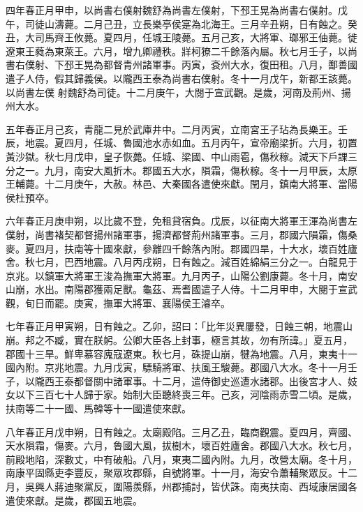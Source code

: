 \begin{pinyinscope}
 四年春正月甲申，以尚書右僕射魏舒為尚書左僕射，下邳王晃為尚書右僕射。戊午，司徒山濤薨。二月己丑，立長樂亭侯寔為北海王。三月辛丑朔，日有蝕之。癸丑，大司馬齊王攸薨。夏四月，任城王陵薨。五月己亥，大將軍、瑯邪王伷薨。徙遼東王蕤為東萊王。六月，增九卿禮秩。牂柯獠二千餘落內屬。秋七月壬子，以尚書右僕射、下邳王晃為都督青州諸軍事。丙寅，袞州大水，復田租。八月，鄯善國遣子人侍，假其歸義侯。以隴西王泰為尚書右僕射。冬十一月戊午，新都王該薨。以尚書左僕
 射魏舒為司徒。十二月庚午，大閱于宣武觀。是歲，河南及荊州、揚州大水。



 五年春正月己亥，青龍二見於武庫井中。二月丙寅，立南宮王子玷為長樂王。壬辰，地震。夏四月，任城、魯國池水赤如血。五月丙午，宣帝廟梁折。六月，初置黃沙獄。秋七月戊申，皇子恢薨。任城、梁國、中山雨雹，傷秋稼。減天下戶課三分之一。九月，南安大風折木。郡國五大水，隕霜，傷秋稼。冬十一月甲辰，太原王輔薨。十二月庚午，大赦。林邑、大秦國各遣使來獻。閏月，鎮南大將軍、當陽侯杜預卒。



 六年春正月庚申朔，以比歲不登，免租貸宿負。戊辰，以征南大將軍王渾為尚書左僕射，尚書褚契都督揚州諸軍事，揚濟都督荊州諸軍事。三月，郡國六隕霜，傷桑麥。夏四月，扶南等十國來獻，參離四千餘落內附。郡國四旱，十大水，壞百姓廬舍。秋七月，巴西地震。八月丙戌朔，日有蝕之。減百姓綿絹三分之一。白龍見于京兆。以鎮軍大將軍王浚為撫軍大將軍。九月丙子，山陽公劉康薨。冬十月，南安山崩，水出。南陽郡獲兩足獸。龜茲、焉耆國遣子人侍。十二月甲申，大閱于宣武觀，旬日而罷。庚寅，撫軍大將軍、襄陽侯王濬卒。



 七年春正月甲寅朔，日有蝕之。乙卯，詔曰：「比年災異屢發，日蝕三朝，地震山崩。邦之不臧，實在朕躬。公卿大臣各上封事，極言其故，勿有所諱。」夏五月，郡國十三旱。鮮卑慕容廆寇遼東。秋七月，硃提山崩，犍為地震。八月，東夷十一國內附。京兆地震。九月戊寅，驃騎將軍、扶風王駿薨。郡國八大水。冬十一月壬子，以隴西王泰都督關中諸軍事。十二月，遣侍御史巡遭水諸郡。出後宮才人、妓女以下三百七十人歸于家。始制大臣聽終喪三年。己亥，河陰雨赤雪二頃。是歲，扶南等二十一國、馬韓等十一國遣使來獻。



 八年春正月戊申朔，日有蝕之。太廟殿陷。三月乙丑，臨商觀震。夏四月，齊國、天水隕霜，傷麥。六月，魯國大風，拔樹木，壞百姓廬舍。郡國八大水。秋七月，前殿地陷，深數丈，中有破船。八月，東夷二國內附。九月，改營太廟。冬十月，南康平固縣吏李豐反，聚眾攻郡縣，自號將軍。十一月，海安令蕭輔聚眾反。十二月，吳興人蔣迪聚黨反，圍陽羨縣，州郡捕討，皆伏誅。南夷扶南、西域康居國各遣使來獻。是歲，郡國五地震。




\end{pinyinscope}
